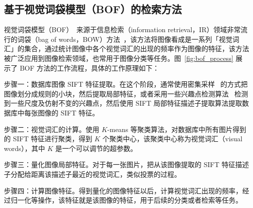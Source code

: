 \subsection{基于视觉词袋模型（BOF）的检索方法}
视觉词袋模型（BOF）~\cite{OHara2011IntroductionTT,Nowak2006SamplingSF,Yang2007EvaluatingBR}来源于信息检索（information retrieval，IR）领域非常流行的词袋（bag of words，BOW）方法~\cite{manning2008introduction,Salton1975AVS}，该方法将图像看成是一系列「视觉词汇」的集合，通过统计图像中各个视觉词汇的出现的频率作为图像的特征，该方法被广泛应用到图像检索领域，也常用于图像分类等任务。图~\ref{fig:bof_process} 展示了 BOF 方法的工作流程，具体的工作原理如下：

步骤一：数据库图像 SIFT 特征提取。在这个阶段，通常使用密集采样~\cite{Vogel2004NaturalSR,FeiFei2005ABH} 的方式把图像划分成规则的小块，然后提取局部特征，或者采用一些兴趣点检测算法~\cite{Mikolajczyk2004ScaleA} 检测到一些尺度及仿射不变的兴趣点，然后使用 SIFT 局部特征描述子提取算法提取数据库中每张图像的 SIFT 特征。

步骤二：视觉词汇的计算。使用 $K$-means 等聚类算法，对数据库中所有图片得到的 SIFT 特征进行聚类，得到 $K$ 个聚类中心，该聚类中心称为视觉词汇（visual words），其中 $K$ 是一个可以调节的超参数。

步骤三：量化图像局部特征。对于每一张图片，把从该图像提取的 SIFT 特征描述子分配给距离该描述子最近的视觉词汇，类似投票的过程。

步骤四：计算图像特征。得到量化的图像特征以后，计算视觉词汇出现的频率，经过归一化等操作，该特征就是该图像的特征，用于后续的分类或者检索等任务。

